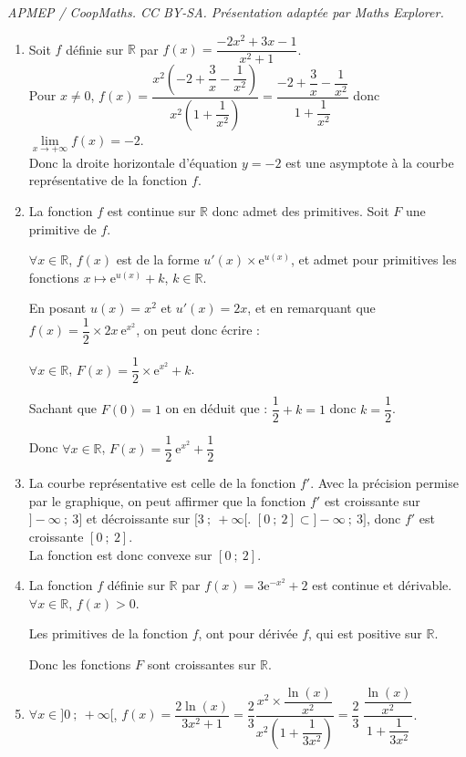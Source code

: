 \documentclass[10pt]{article}
\providecommand{\R}{\mathbb{R}}
\providecommand{\e}{{\mathrm{e}}}
\begin{document}
\noindent\textit{APMEP / CoopMaths. CC BY-SA. Présentation adaptée par Maths Explorer.}\par\medskip
\medskip

\begin{enumerate}
	\item Soit $f$ définie sur $\R$ par $f(x)=\dfrac{-2x^2+3x-1}{x^2+1}$.\\
	Pour $x\neq 0$, $f(x)=\dfrac{x^2\left(-2+\dfrac{3}{x}-\dfrac{1}{x^2}\right)}{x^2\left(1+\dfrac{1}{x^2}\right)}=\dfrac{-2+\dfrac{3}{x}-\dfrac{1}{x^2}}{1+\dfrac{1}{x^2}}$ donc $\displaystyle\lim\limits_{x \rightarrow +\infty} f(x)=-2$.\\ Donc la droite horizontale d'équation $y=-2$ est une asymptote à la courbe représentative de la fonction $f$. \hfill {}
	
	\item La fonction $f$ est continue sur $\R$ donc admet des primitives. Soit $F$ une primitive de $f$.
	
$\forall x \in \R$, $f(x)$ est de la forme $u'(x)\times \e^{u(x)}$, et admet pour primitives les fonctions $x\mapsto\e^{u(x)}+k$, $k\in\R$.

En posant $u(x) = x^2$ et $u'(x)=2x$, et en remarquant que $f(x)=\dfrac{1}{2}\times 2x~\e^{x^2}$, on peut donc écrire :

$\forall x \in \R$, $F(x)=\dfrac{1}{2}\times \e^{x^2}+k$.
	
	Sachant que $F(0)=1$ on en déduit que : $\dfrac{1}{2}+k=1$ donc $k=\dfrac{1}{2}$.

	Donc $\forall x \in \R$, $F(x)=\dfrac{1}{2}~\e^{x^2}+\dfrac{1}{2}$  \hfill {}
	\item La courbe représentative est celle de la fonction $f'$. Avec la précision permise par le graphique, on peut affirmer que la fonction $f'$ est croissante sur $]-\infty~;~3]$ et décroissante sur $[3~;~+\infty[$. $[0~;~2] \subset ]-\infty~;~3]$, donc $f'$ est croissante $[0~;~2]$.\\
La fonction est donc convexe sur $[0~;~2]$. \hfill {}
	\item La fonction $f$ définie sur $\R$ par $f(x)=3\e^{-x^2}+2$ est continue et dérivable. $\forall x \in \R$, $f(x)>0$.
	
Les primitives de la fonction $f$, ont pour dérivée $f$, qui est positive sur $\R$.

Donc les fonctions $F$ sont croissantes sur $\R$. \hfill {}
	\item $\forall x \in ]0~;~+ \infty[$, $f(x)=\dfrac{2\ln(x)}{3x^2+1}= \dfrac23\dfrac{x^2\times \dfrac{\ln(x)}{x^2}}{x^2\left(1+\dfrac{1}{3x^2}\right)}= \dfrac23~\dfrac{\dfrac{\ln(x)}{x^2}}{1+\dfrac{1}{3x^2}}$.


\end{enumerate}
\end{document}
